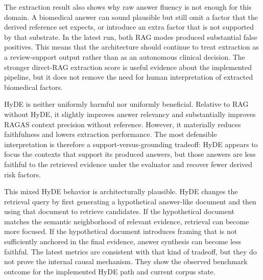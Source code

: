 The extraction result also shows why raw answer fluency is not enough for this domain. A biomedical answer can sound plausible but still omit a factor that the derived reference set expects, or introduce an extra factor that is not supported by that substrate. In the latest run, both RAG modes produced substantial false positives. This means that the architecture should continue to treat extraction as a review-support output rather than as an autonomous clinical decision. The stronger direct-RAG extraction score is useful evidence about the implemented pipeline, but it does not remove the need for human interpretation of extracted biomedical factors.

HyDE is neither uniformly harmful nor uniformly beneficial. Relative to RAG without HyDE, it slightly improves answer relevancy and substantially improves RAGAS context precision without reference. However, it materially reduces faithfulness and lowers extraction performance. The most defensible interpretation is therefore a support-versus-grounding tradeoff: HyDE appears to focus the contexts that support its produced answers, but those answers are less faithful to the retrieved evidence under the evaluator and recover fewer derived risk factors.

This mixed HyDE behavior is architecturally plausible. HyDE changes the retrieval query by first generating a hypothetical answer-like document and then using that document to retrieve candidates. If the hypothetical document matches the semantic neighborhood of relevant evidence, retrieval can become more focused. If the hypothetical document introduces framing that is not sufficiently anchored in the final evidence, answer synthesis can become less faithful. The latest metrics are consistent with that kind of tradeoff, but they do not prove the internal causal mechanism. They show the observed benchmark outcome for the implemented HyDE path and current corpus state.

